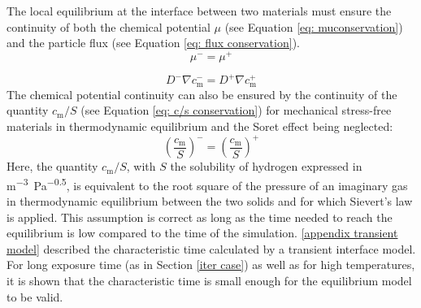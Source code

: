 
The local equilibrium at the interface between two materials must ensure  the continuity of both the chemical potential $\mu$ (see Equation \ref{eq: muconservation}) and the particle flux (see Equation \ref{eq: flux conservation}).
\begin{equation}
            \mu^- = \mu^+  \label{eq: muconservation}  
\end{equation}
    
\begin{equation}
        D^- \nabla c_\mathrm{m}^- = D^+ \nabla c_\mathrm{m}^+ \label{eq: flux conservation} 
\end{equation}
The chemical potential continuity can also be ensured by the continuity of the quantity $c_\mathrm{m}/S$ (see Equation \ref{eq: c/s conservation}) for mechanical stress-free materials in thermodynamic equilibrium and the Soret effect being neglected:
\begin{equation}
                \left(\frac{c_\mathrm{m}}{S}\right)^- = \left(\frac{c_\mathrm{m}}{S}\right)^+  \label{eq: c/s conservation}  
\end{equation}
Here, the quantity $c_\mathrm{m}/S$, with $S$ the solubility of hydrogen expressed in \si{m^{-3}.Pa^{-0.5}}, is equivalent to the root square of the pressure of an imaginary gas in thermodynamic equilibrium between the two solids and for which Sievert's law is applied.  
This assumption is correct as long as the time needed to reach the equilibrium is low compared to the time of the simulation.
\ref{appendix transient model} described the characteristic time calculated by a transient interface model.
For long exposure time (as in Section \ref{iter case}) as well as for high temperatures, it is shown that the characteristic time is small enough for the equilibrium model to be valid.


